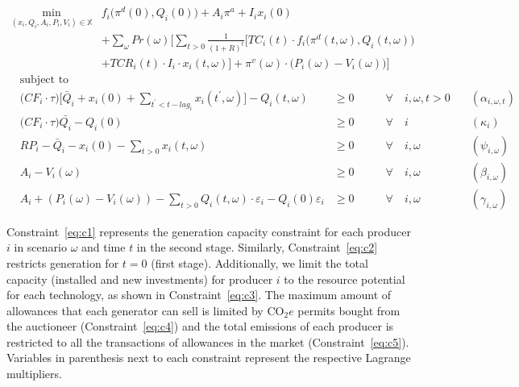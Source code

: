 \documentclass[11pt, letterpaper]{article}
\begin{document}
\small
\begin{align}
\min_{(x_i,Q_i,A_i,P_i,V_i)\in \mathbb{X}}  & f_i \big( \pi^d(0),Q_i(0)\big)+ A_i \pi^{a} + I_i x_i(0) \nonumber \\ 
& + \sum_{\omega} Pr(\omega)   \Bigg[ \sum_{t>0} \frac{1}{(1+R)^t} \Big[ TC_i(t)\cdot f_i \big( \pi^d(t,\omega),Q_i(t,\omega) \big) \nonumber\\
&  + TCR_i(t) \cdot I_i\cdot x_i(t,\omega) \Big] + \pi^v(\omega)\cdot \big(P_i(\omega)-V_i(\omega)\big) \Bigg]   \label{eq:prod}
\end{align}
\begin{align}
&\textrm{subject to \ } \nonumber\\
    &\Big(CF_i \cdot\tau\Big)  \Bigg[\bar{Q}_i + x_i(0)+\sum_{t^{\prime}<t-lag_i} x_i(t^\prime,\omega) \Bigg] - Q_i(t,\omega) & \geq 0  & \qquad \forall \quad i,\omega, t  > 0   & \quad (\alpha_{i,\omega,t})      \label{eq:c1}\\
    &\Big(CF_i\cdot\tau \Big)\bar{Q_i}-Q_{i}(0)                                                                                 & \geq 0  & \qquad \forall \quad i                  &  \quad (\kappa_i) \label{eq:c2} \\
    &RP_i - \bar{Q}_i - x_i(0) - \sum_{t > 0} x_i(t,\omega)                                                                     & \geq 0  & \qquad \forall \quad i,\omega           &   \quad (\psi_{i,\omega})\label{eq:c3} \\
    &A_{i} -V_i(\omega)                                                                                                         & \geq  0 & \qquad \forall \quad i,\omega           & \quad (\beta_{i,\omega}) \label{eq:c4}\\
    &A_{i} + (P_i(\omega) - V_i(\omega))-\sum_{t>0}Q_i(t, \omega)\cdot \varepsilon_{i}-Q_i(0)\varepsilon_{i}           & \geq  0 & \qquad \forall \quad i, \omega          & \quad (\gamma_{i,\omega}) \label{eq:c5}
  \end{align}
\normalsize

Constraint~\ref{eq:c1} represents the generation capacity constraint for each producer $i$ in scenario $\omega$ and time $t$ in the second stage. Similarly, Constraint~\ref{eq:c2} restricts generation for $t=0$ (first stage). Additionally, we limit the total capacity (installed and new investments) for producer $i$ to the resource potential for each technology, as shown in Constraint~\ref{eq:c3}. The maximum amount of allowances that each generator can sell is limited by CO$_2e$ permits bought from the auctioneer (Constraint~\ref{eq:c4}) and the total emissions of each producer is restricted to all the transactions of allowances in the market (Constraint~\ref{eq:c5}). Variables in parenthesis next to each constraint represent the respective Lagrange multipliers.
\end{document}

